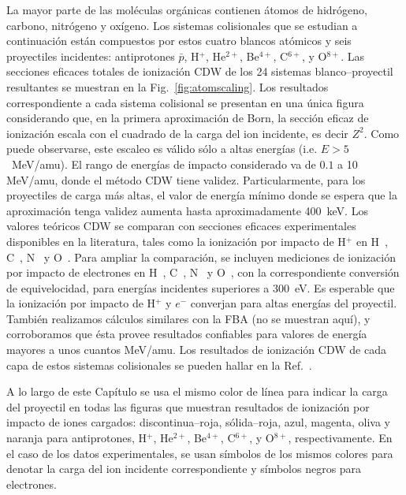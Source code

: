 La mayor parte de las moléculas orgánicas contienen átomos de hidrógeno, 
carbono, nitrógeno y oxígeno. Los sistemas colisionales que se estudian 
a continuación están compuestos por estos cuatro blancos atómicos 
y seis proyectiles incidentes: antiprotones $\bar{p}$, H$^{+}$, 
He$^{2+}$, Be$^{4+}$, C$^{6+}$, y O$^{8+}$. Las secciones eficaces 
totales de ionización CDW de los 24 sistemas blanco--proyectil 
resultantes se muestran en la Fig.~\ref{fig:atomscaling}. Los resultados 
correspondiente a cada sistema colisional se presentan en una única 
figura considerando que, en la primera aproximación de Born, la sección 
eficaz de ionización escala con el cuadrado de la carga del ion 
incidente, es decir $Z^{2}$. Como puede observarse, este escaleo es 
válido sólo a altas energías (i.e. $E>5$~MeV/amu). El rango de energías 
de impacto considerado va de $0.1$ a 10 MeV/amu, donde el método CDW 
tiene validez. Particularmente, para los proyectiles de carga más altas, 
el valor de energía mínimo donde se espera que la aproximación tenga 
validez aumenta hasta aproximadamente 400~keV. Los valores teóricos CDW 
se comparan con secciones eficaces experimentales disponibles en la 
literatura, tales como la ionización por impacto de H$^+$ en 
H~\cite{Shah:81}, C~\cite{Toburen:72}, N~\cite{Rudd:85} y 
O~\cite{Rudd:85}. Para ampliar la comparación, se incluyen mediciones de 
ionización por impacto de electrones en H~\cite{Shah:87}, 
C~\cite{Brook:78}, N~\cite{Brook:78} y O~\cite{Thompson:95}, con la 
correspondiente conversión de equivelocidad, para energías incidentes 
superiores a 300~eV. Es esperable que la ionización por impacto de 
H$^+$ y $e^-$ converjan para altas energías del proyectil. También 
realizamos cálculos similares con la FBA (no se muestran aquí), y 
corroboramos que ésta provee resultados confiables para valores de 
energía mayores a unos cuantos MeV/amu. Los resultados de ionización CDW 
de cada capa de estos sistemas colisionales se pueden hallar en la 
Ref.~\cite{Miraglia:19}.

A lo largo de este Capítulo se usa el mismo color de línea para indicar 
la carga del proyectil en todas las figuras que muestran resultados de 
ionización por impacto de iones cargados: discontinua--roja, 
sólida--roja, azul, magenta, oliva y naranja para antiprotones, H$^{+}$, 
He$^{2+}$, Be$^{4+}$, C$^{6+}$, y O$^{8+}$, respectivamente. En el caso 
de los datos experimentales, se usan símbolos de los mismos colores para 
denotar la carga del ion incidente correspondiente y símbolos negros 
para electrones. 

